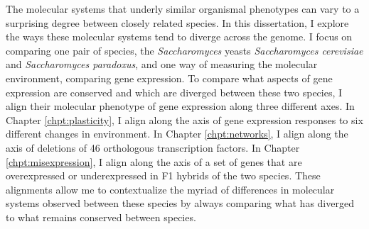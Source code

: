 The molecular systems that underly similar organismal phenotypes can vary to a surprising degree between closely related species. In this dissertation, I explore the ways these molecular systems tend to diverge across the genome. I focus on comparing one pair of species, the \textit{Saccharomyces} yeasts  \textit{Saccharomyces cerevisiae} and \textit{Saccharomyces paradoxus}, and one way of measuring the molecular environment, comparing gene expression. To compare what aspects of gene expression are conserved and which are diverged between these two species, I align their molecular phenotype of gene expression along three different axes. In Chapter \ref{chpt:plasticity}, I align along the axis of gene expression responses to six different changes in environment. In Chapter \ref{chpt:networks}, I align along the axis of deletions of 46 orthologous transcription factors. In Chapter \ref{chpt:misexpression}, I align along the axis of a set of genes that are overexpressed or underexpressed in F1 hybrids of the two species. These alignments allow me to contextualize the myriad of differences in molecular systems observed between these species by always comparing what has diverged to what remains conserved between species.